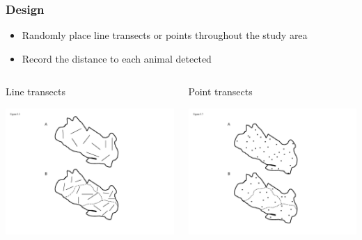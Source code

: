 \documentclass[color=usenames,dvipsnames]{beamer}\usepackage[]{graphicx}\usepackage[]{color}
\begin{document}
\begin{frame}
  \frametitle{Design}
  \Large
  \begin{itemize}%
    \item Randomly place line transects or points throughout the study
      area
    \item Record the distance to each animal detected
  \end{itemize}
  \vspace{0.5cm}
  \begin{columns}
    \begin{column}{0.5\textwidth}
      {\centering Line transects \par}
      \includegraphics[width=\textwidth]{figs/Fig9-7}
    \end{column}
    \begin{column}{0.5\textwidth}
      {\centering Point transects \par}
      \includegraphics[width=\textwidth]{figs/Fig9-9}
    \end{column}
  \end{columns}
\end{frame}
\end{document}
